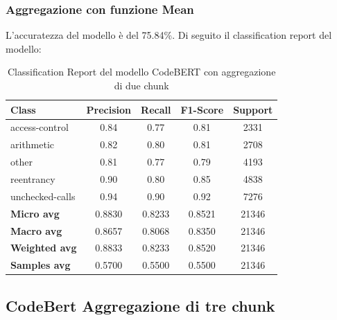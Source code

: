\documentclass[../../Thesis.tex]{subfiles}
\begin{document}
\subsubsection{Aggregazione con funzione Mean}
L'accuratezza del modello è del 75.84\%. Di seguito il classification report del modello:
\begin{table}[H]
    \centering
    \small
    \begin{tabular}{lcccc}
    \hline
    \textbf{Class} & \textbf{Precision} & \textbf{Recall} & \textbf{F1-Score} & \textbf{Support} \\
    \hline
    access-control & 0.84 & 0.77 & 0.81 & 2331 \\
    arithmetic & 0.82 & 0.80 & 0.81 & 2708 \\
    other & 0.81 & 0.77 & 0.79 & 4193 \\
    reentrancy & 0.90 & 0.80 & 0.85 & 4838 \\
    unchecked-calls & 0.94 & 0.90 & 0.92 & 7276 \\
    \hline
    \textbf{Micro avg} & 0.8830 & 0.8233 & 0.8521 & 21346 \\
    \textbf{Macro avg} & 0.8657 & 0.8068 & 0.8350 & 21346 \\
    \textbf{Weighted avg} & 0.8833 & 0.8233 & 0.8520 & 21346 \\
    \textbf{Samples avg} & 0.5700 & 0.5500 & 0.5500 & 21346 \\
    \hline
    \end{tabular}
    \caption{Classification Report del modello CodeBERT con aggregazione di due chunk}
    \end{table}


    
\subsection{CodeBert Aggregazione di tre chunk}
\end{document}
